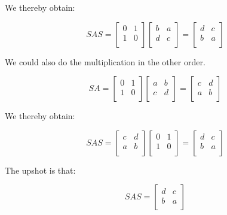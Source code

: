 \documentclass[10pt]{amsart}
\begin{document}
We thereby obtain:

$$SAS = \left[\begin{matrix} 0 & 1 \\ 1 & 0 \\\end{matrix}\right] \left[\begin{matrix} b & a \\ d & c\\\end{matrix}\right] = \left[\begin{matrix} d & c \\ b & a \\\end{matrix}\right]$$

We could also do the multiplication in the other order.

$$SA = \left[\begin{matrix} 0 & 1 \\ 1 & 0 \\\end{matrix}\right] \left[\begin{matrix} a & b \\ c & d \\\end{matrix} \right] = \left[\begin{matrix} c & d \\ a & b \\\end{matrix}\right]$$

We thereby obtain:

$$SAS = \left[\begin{matrix} c & d \\ a & b \\\end{matrix}\right]\left[\begin{matrix} 0 & 1 \\ 1 & 0 \\\end{matrix}\right] = \left[\begin{matrix} d & c \\ b & a \\\end{matrix}\right]$$

The upshot is that:

$$SAS = \left[\begin{matrix} d & c \\ b & a \\\end{matrix}\right]$$
\end{document}
